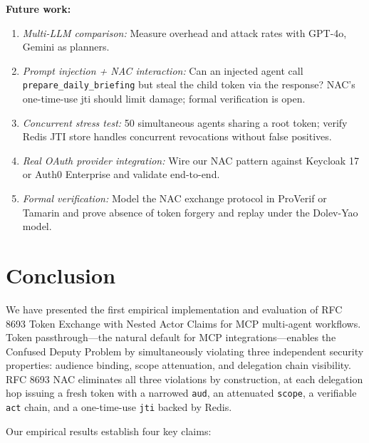 \documentclass[journal]{IEEEtran}
\begin{document}
\textbf{Future work:}
\begin{enumerate}
  \item \textit{Multi-LLM comparison:} Measure overhead and attack rates with GPT-4o, Gemini as planners.
  \item \textit{Prompt injection + NAC interaction:} Can an injected agent call \texttt{prepare\_daily\_briefing} but steal the child token via the response? NAC's one-time-use jti should limit damage; formal verification is open.
  \item \textit{Concurrent stress test:} 50 simultaneous agents sharing a root token; verify Redis JTI store handles concurrent revocations without false positives.
  \item \textit{Real OAuth provider integration:} Wire our NAC pattern against Keycloak 17 or Auth0 Enterprise and validate end-to-end.
  \item \textit{Formal verification:} Model the NAC exchange protocol in ProVerif \cite{blanchet2001} or Tamarin \cite{meier2013} and prove absence of token forgery and replay under the Dolev-Yao model.
\end{enumerate}


\section{Conclusion}
\label{sec:conclusion}

We have presented the first empirical implementation and evaluation of RFC 8693 Token Exchange with Nested Actor Claims for MCP multi-agent workflows. Token passthrough—the natural default for MCP integrations—enables the Confused Deputy Problem by simultaneously violating three independent security properties: audience binding, scope attenuation, and delegation chain visibility. RFC 8693 NAC eliminates all three violations by construction, at each delegation hop issuing a fresh token with a narrowed \texttt{aud}, an attenuated \texttt{scope}, a verifiable \texttt{act} chain, and a one-time-use \texttt{jti} backed by Redis.

Our empirical results establish four key claims:
\end{document}
